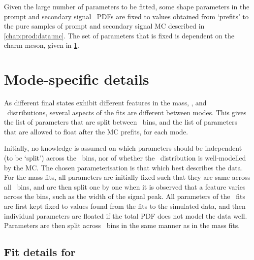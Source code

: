 Given the large number of parameters to be fitted, some shape parameters in the 
prompt and secondary signal \lnipchisq\ \acp{PDF} are fixed to values obtained 
from `prefits' to the pure samples of prompt and secondary signal \ac{MC} 
described in \cref{chap:prod:data:mc}.
The set of parameters that is fixed is dependent on the charm meson, given in 
\cref{chap:prod:fitting:details}.

\section{Mode-specific details}
\label{chap:prod:fitting:details}

As different final states exhibit different features in the mass, \deltam, and 
\lnipchisq\ distributions, several aspects of the fits are different between 
modes.
This  gives the list of parameters that are 
split between \pTy\ bins, and the list of parameters that are allowed to float 
after the \ac{MC} prefits, for each mode.

Initially, no knowledge is assumed on which parameters should be independent 
(to be `split') across the \pTy\ bins, nor of whether the \lnipchisq\ 
distribution is well-modelled by the \ac{MC}.
The chosen parameterisation is that which best describes the data.
For the mass fits, all parameters are initially fixed such that they are same 
across all \pTy\ bins, and are then split one by one when it is observed that a 
feature varies across the bins, such as the width of the signal peak.
All parameters of the \lnipchisq\ fits are first kept fixed to values found 
from the fits to the simulated data, and then individual parameters are floated 
if the total PDF does not model the data well.
Parameters are then split across \pTy\ bins in the same manner as in the mass 
fits.

\subsection{Fit details for \PDzero}
\label{chap:prod:fitting:details:D0ToKpi}

